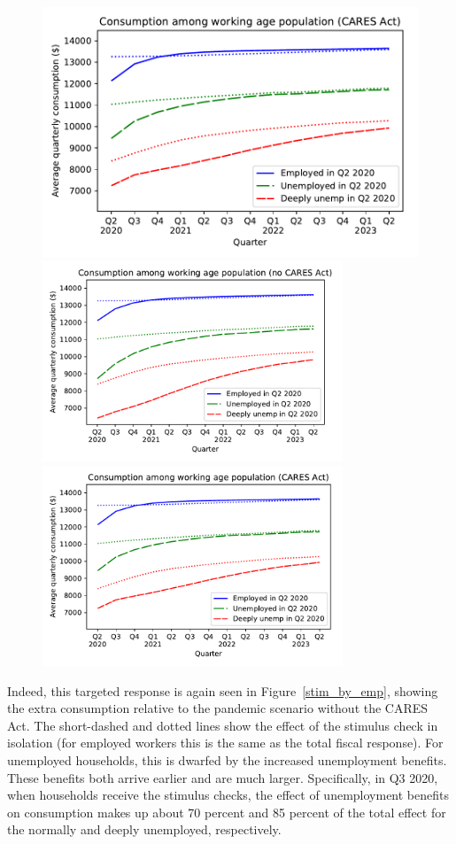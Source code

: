 \documentclass[titlepage,a4paper]{\econtex}
\begin{document}
\begin{figure}
{    \includegraphics[width=0.8\webWidth\textwidth]{./Figures/ConRespByEmpStateWStim}
  } %
  { \includegraphics[width=0.8\textwidth]{./Figures/ConRespByEmpStateNoStim}
    \includegraphics[width=0.8\textwidth]{./Figures/ConRespByEmpStateWStim}}
\end{figure}

Indeed, this targeted response is again seen in Figure~\ref{stim_by_emp},
showing the extra consumption relative to the pandemic scenario without the CARES Act.
The short-dashed and dotted lines show the effect of the stimulus check in isolation (for employed workers this is the same as the total fiscal response).
For unemployed households, this is dwarfed by the increased unemployment benefits.
These benefits both arrive earlier and are much larger.
Specifically, in Q3 2020, when households receive the stimulus checks, the effect of unemployment benefits on consumption makes up about 70 percent and 85 percent of the total effect for the normally and deeply unemployed, respectively.
\end{document}
